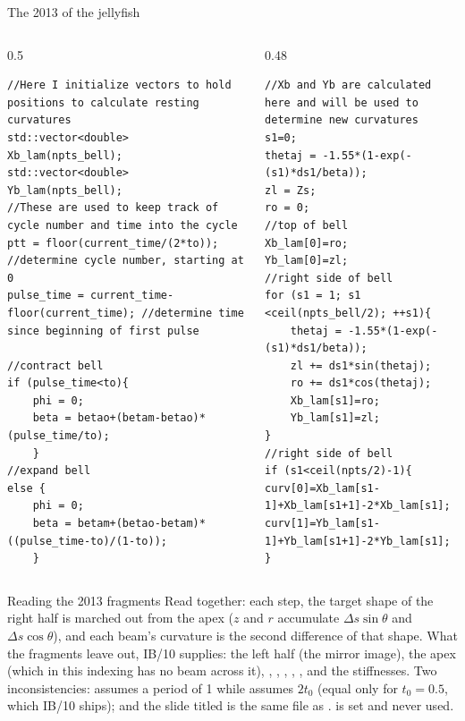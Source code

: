 \documentclass[aspectratio=169,11pt]{beamer}
\begin{document}
\begin{frame}[fragile]{The 2013  of the jellyfish}
\label{fr:jellycode}
\begin{columns}[T,onlytextwidth]
\begin{column}{0.5\textwidth}
\begin{lstlisting}[style=cpptiny]
//Here I initialize vectors to hold positions to calculate resting curvatures
std::vector<double> Xb_lam(npts_bell);
std::vector<double> Yb_lam(npts_bell);
//These are used to keep track of cycle number and time into the cycle
ptt = floor(current_time/(2*to));   //determine cycle number, starting at 0
pulse_time = current_time-floor(current_time); //determine time since beginning of first pulse

//contract bell
if (pulse_time<to){
	phi = 0;
	beta = betao+(betam-betao)*(pulse_time/to);
	}
//expand bell
else {
	phi = 0;
	beta = betam+(betao-betam)*((pulse_time-to)/(1-to));
	}
\end{lstlisting}
\end{column}
\begin{column}{0.48\textwidth}
\begin{lstlisting}[style=cpptiny]
//Xb and Yb are calculated here and will be used to determine new curvatures
s1=0;
thetaj = -1.55*(1-exp(-(s1)*ds1/beta));
zl = Zs;
ro = 0;
//top of bell
Xb_lam[0]=ro;
Yb_lam[0]=zl;
//right side of bell
for (s1 = 1; s1 <ceil(npts_bell/2); ++s1){
	thetaj = -1.55*(1-exp(-(s1)*ds1/beta));
	zl += ds1*sin(thetaj);
	ro += ds1*cos(thetaj);
	Xb_lam[s1]=ro;
	Yb_lam[s1]=zl;
}
//right side of bell
if (s1<ceil(npts/2)-1){
curv[0]=Xb_lam[s1-1]+Xb_lam[s1+1]-2*Xb_lam[s1];
curv[1]=Yb_lam[s1-1]+Yb_lam[s1+1]-2*Yb_lam[s1];
}
\end{lstlisting}
\end{column}
\end{columns}
\end{frame}

\begin{frame}{Reading the 2013 fragments}
\label{fr:jellycode2}
\small Read together: each step, the target shape of the right half is marched out from the apex ($z$ and $r$ accumulate $\Delta s\sin\theta$ and $\Delta s\cos\theta$), and each beam's curvature is the second difference of that shape. What the fragments leave out, IB/10 supplies: the left half (the mirror image), the apex (which in this indexing has no beam across it), , , , , ,  and the stiffnesses. Two inconsistencies:  assumes a period of 1 while  assumes $2t_0$ (equal only for $t_0 = 0.5$, which IB/10 ships); and the slide titled  is the same file as .  is set and never used.
\end{frame}
\end{document}
